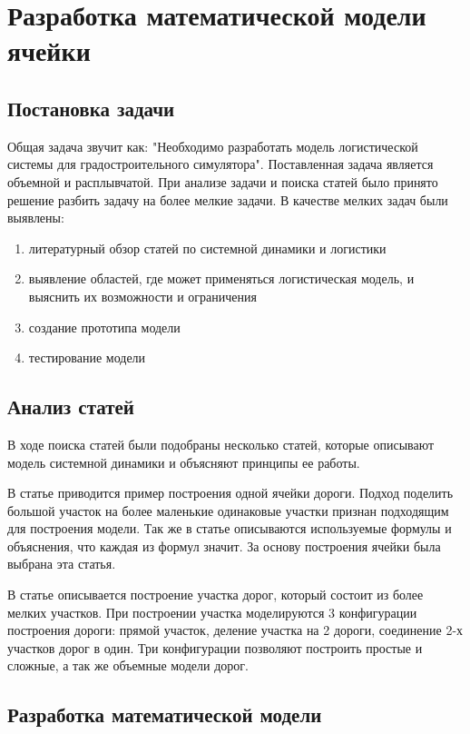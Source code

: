 \section{Разработка математической модели ячейки}

\subsection{Постановка задачи}

Общая задача звучит как: "Необходимо разработать модель логистической системы для градостроительного симулятора". Поставленная задача является объемной и расплывчатой. При анализе задачи и поиска статей было принято решение разбить задачу на более мелкие задачи. В качестве мелких задач были выявлены:
\begin{enumerate}
    \item литературный обзор статей по системной динамики и логистики
    \item выявление областей, где может применяться логистическая модель, и выяснить их возможности и ограничения
    \item создание прототипа модели
    \item тестирование модели
\end{enumerate}

\subsection{Анализ статей}

В ходе поиска статей были подобраны несколько статей, которые описывают модель системной динамики и объясняют принципы ее работы.

В статье \cite{benaich2015exploring} приводится пример построения одной ячейки дороги. Подход поделить большой участок на более маленькие одинаковые участки признан подходящим для построения модели. Так же в статье описываются используемые формулы и объяснения, что каждая из формул значит. За основу построения ячейки была выбрана эта статья. 

В статье \cite{jin2022variable} описывается построение участка дорог, который состоит из более мелких участков. При построении участка моделируются 3 конфигурации построения дороги: прямой участок, деление участка на 2 дороги, соединение 2-х участков дорог в один. Три конфигурации позволяют построить простые и сложные, а так же объемные модели дорог.

\subsection{Разработка математической модели}

